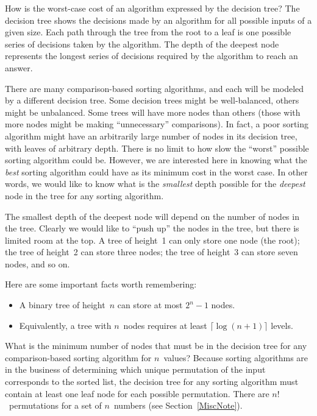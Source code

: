 How is the worst-case cost of an algorithm expressed by the
decision tree?
The decision tree shows the decisions made by an algorithm for all
possible inputs of a given size.
Each path through the tree from the root to a leaf is one possible
series of decisions taken by the algorithm.
The depth of the deepest node represents the longest series of
decisions required by the algorithm to reach an answer.

There are many comparison-based sorting algorithms, and each will be
modeled by a different decision tree.
Some decision trees might be well-balanced, others might be unbalanced.
Some trees will have more nodes than others (those with more nodes
might be making ``unnecessary'' comparisons).
In fact, a poor sorting algorithm might have an arbitrarily large
number of nodes in its decision tree, with leaves of arbitrary depth.
There is no limit to how slow the ``worst'' possible sorting
algorithm could be.
However, we are interested here in knowing what the \emph{best}
sorting algorithm could have as its minimum cost in the worst
case.
In other words, we would like to know what is the \emph{smallest}
depth possible for the \emph{deepest} node in the tree for any sorting
algorithm.

The smallest depth of the deepest node will depend on the number of
nodes in the tree.
Clearly we would like to ``push up'' the nodes in the tree, but there
is limited room at the top.
A tree of height~1 can only store one node (the root);
the tree of height~2 can store three nodes; the tree of height~3 can
store seven nodes, and so on.

Here are some important facts worth remembering:
\begin{itemize}
\item A binary tree of height~\(n\) can store at most \(2^n-1\)
nodes.
\item Equivalently, a tree with \(n\)~nodes requires at least
\(\lceil \log (n+1) \rceil\) levels.
\end{itemize}

What is the minimum number of nodes that must be in the decision tree
for any comparison-based sorting algorithm for \(n\)~values?
Because sorting algorithms are in the business of determining which
unique permutation of the input corresponds to the sorted list,
the decision tree for any sorting algorithm must contain at least one
leaf node for each possible permutation.
There are \(n!\)~permutations for a set of \(n\)~numbers
(see Section~\ref{MiscNote}). 

